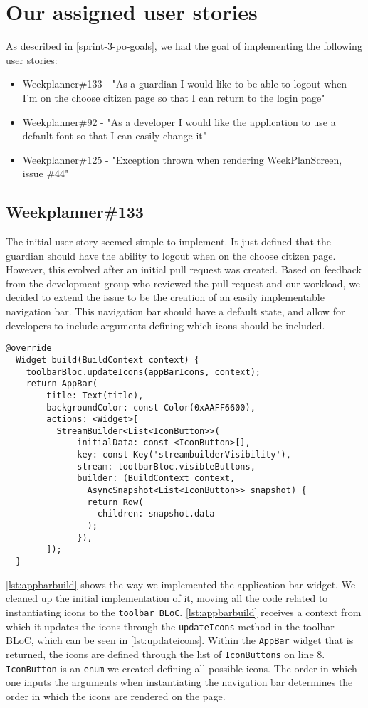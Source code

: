 \section{Our assigned user stories}\label{sec:sprint-3-our-stories}
As described in \autoref{sprint-3-po-goals}, we had the goal of implementing the following user stories:
\begin{itemize}\label{item:our-stories-sprint-3}
    \item Weekplanner\#133 - "As a guardian I would like to be able to logout when I'm on the choose citizen page so that I can return to the login page"
    \item Weekplanner\#92 - "As a developer I would like the application to use a default font so that I can easily change it"
    \item Weekplanner\#125 - "Exception thrown when rendering WeekPlanScreen, issue \#44"
\end{itemize}

\subsection{Weekplanner\#133}
The initial user story seemed simple to implement.
It just defined that the guardian should have the ability to logout when on the choose citizen page.
However, this evolved after an initial pull request was created.
Based on feedback from the development group who reviewed the pull request and our workload, we decided to extend the issue to be the creation of an easily implementable navigation bar.
This navigation bar should have a default state, and allow for developers to include arguments defining which icons should be included.

\begin{lstlisting}[caption={Building the appbar},label={lst:appbarbuild}]
  @override
  Widget build(BuildContext context) {
    toolbarBloc.updateIcons(appBarIcons, context);
    return AppBar(
        title: Text(title),
        backgroundColor: const Color(0xAAFF6600),
        actions: <Widget>[
          StreamBuilder<List<IconButton>>(
              initialData: const <IconButton>[],
              key: const Key('streambuilderVisibility'),
              stream: toolbarBloc.visibleButtons,
              builder: (BuildContext context, 
                AsyncSnapshot<List<IconButton>> snapshot) {
                return Row(
                  children: snapshot.data
                );
              }),
        ]);
  }
\end{lstlisting}
\autoref{lst:appbarbuild} shows the way we implemented the application bar widget.
We cleaned up the initial implementation of it, moving all the code related to instantiating icons to the \texttt{toolbar BLoC}.
\autoref{lst:appbarbuild} receives a context from which it updates the icons through the \texttt{updateIcons} method in the toolbar BLoC, which can be seen in \autoref{lst:updateicons}.
Within the \texttt{AppBar} widget that is returned, the icons are defined through the list of \texttt{IconButtons} on line 8.
\texttt{IconButton} is an \texttt{enum} we created defining all possible icons.
The order in which one inputs the arguments when instantiating the navigation bar determines the order in which the icons are rendered on the page. 

